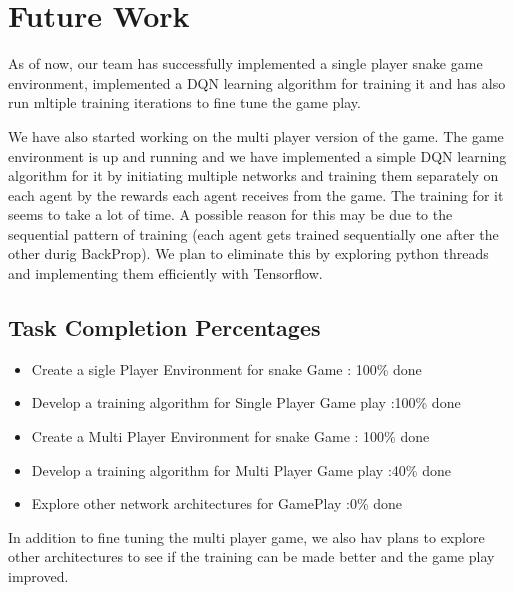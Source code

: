 \documentclass[conference,10pt]{IEEEtran}
\begin{document}
\section{Future Work}
As of now, our team has successfully implemented a single player snake game environment, implemented a DQN learning algorithm for training it and has also run mltiple training iterations to fine tune the game play.
\break
\break

We have also started working on the multi player version of the game. The game environment is up and running and we have implemented a simple DQN learning algorithm for it by initiating multiple networks and training them separately on each agent by the rewards each agent receives from the game.
The training for it seems to take a lot of time. A possible reason for this may be due to the sequential pattern of training (each agent gets trained sequentially one after the other durig BackProp). We plan to eliminate this by exploring python threads and implementing them efficiently with Tensorflow.
\break
\break
\subsection{Task Completion Percentages}
\begin{itemize}
\item{Create a sigle Player Environment for snake Game} : 100\%	done
\item{Develop a training algorithm for Single Player Game play} :100\% done
\item{Create a Multi Player Environment for snake Game} : 100\%	done
\item{Develop a training algorithm for Multi Player Game play} :40\% done
\item{Explore other network architectures for GamePlay} :0\% done
\end{itemize}

\break
\break
In addition to fine tuning the multi player game, we also hav plans to explore other architectures to see if the training can be made better and the game play improved.
\break
\break
\end{document}
